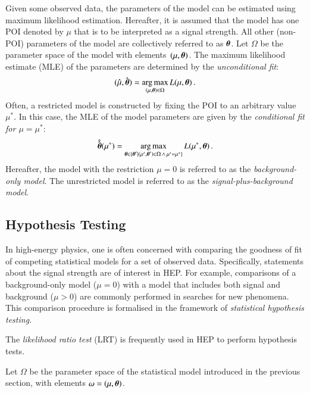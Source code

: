 Given some observed data, the parameters of the model can be estimated using
maximum likelihood estimation. Hereafter, it is assumed that the model has one
POI denoted by $\mu$ that is to be interpreted as a signal strength. All other
(non-POI) parameters of the model are collectively referred to as
$\myvec{\theta}$. Let $\Omega$ be the parameter space of the model with
elements~$(\mu, \myvec{\theta})$. The maximum likelihood estimate (MLE) of the
parameters are determined by the \emph{unconditional fit}:
\begin{align}
  (\muhat, \hat{\myvec{\theta}}) = \argmax_{(\mu, \myvec{\theta}) \in \Omega} L(\mu, \myvec{\theta}) \,\text{.}
  \label{eq:unconditional_fit}
\end{align}
Often, a restricted model is constructed by fixing the POI to an arbitrary value
$\mu^*$. In this case, the MLE of the model parameters are given by the
\emph{conditional fit for $\mu = \mu^*$}:
\begin{align}
  \hat{\hat{\myvec{\theta}}}(\mu^*) = \argmax_{\myvec{\theta} \in \{ \myvec{\theta}^\prime \mid (\mu^\prime, \myvec{\theta}^\prime) \in \Omega \,\land\, \mu^\prime = \mu^* \} } L(\mu^*, \myvec{\theta}) \,\text{.}
  \label{eq:conditional_fit}
\end{align}
Hereafter, the model with the restriction $\mu = 0$ is referred to as the
\emph{background-only model}. The unrestricted model is referred to as the
\emph{signal-plus-background model}.



\subsection{Hypothesis Testing}

In high-energy physics, one is often concerned with comparing the goodness of
fit of competing statistical models for a set of observed data. Specifically,
statements about the signal strength are of interest in HEP. For example,
comparisons of a background-only model ($\mu = 0$) with a model that includes
both signal and background ($\mu > 0$) are commonly performed in searches for
new phenomena.  This comparison procedure is formalised in the framework of
\emph{statistical hypothesis testing.}

The \emph{likelihood ratio test} (LRT) is frequently used in HEP to perform
hypothesis tests.

Let $\Omega$ be the parameter space of the statistical model introduced in the
previous section, with elements $\omega = (\mu, \myvec{\theta})$.


